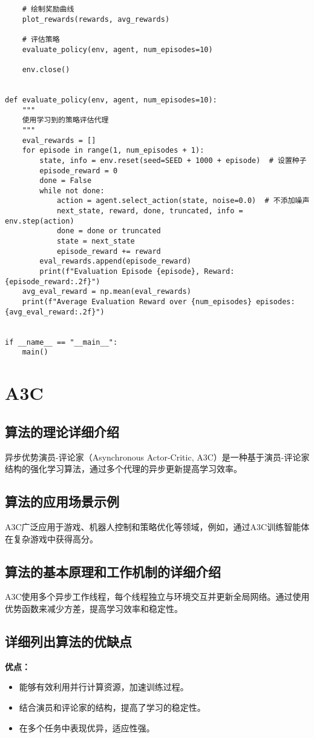 \begin{lstlisting}
    # 绘制奖励曲线
    plot_rewards(rewards, avg_rewards)

    # 评估策略
    evaluate_policy(env, agent, num_episodes=10)

    env.close()


def evaluate_policy(env, agent, num_episodes=10):
    """
    使用学习到的策略评估代理
    """
    eval_rewards = []
    for episode in range(1, num_episodes + 1):
        state, info = env.reset(seed=SEED + 1000 + episode)  # 设置种子
        episode_reward = 0
        done = False
        while not done:
            action = agent.select_action(state, noise=0.0)  # 不添加噪声
            next_state, reward, done, truncated, info = env.step(action)
            done = done or truncated
            state = next_state
            episode_reward += reward
        eval_rewards.append(episode_reward)
        print(f"Evaluation Episode {episode}, Reward: {episode_reward:.2f}")
    avg_eval_reward = np.mean(eval_rewards)
    print(f"Average Evaluation Reward over {num_episodes} episodes: {avg_eval_reward:.2f}")


if __name__ == "__main__":
    main()

\end{lstlisting}


\section{A3C}
\subsection*{算法的理论详细介绍}
异步优势演员-评论家（Asynchronous Actor-Critic, A3C）是一种基于演员-评论家结构的强化学习算法，通过多个代理的异步更新提高学习效率。

\subsection*{算法的应用场景示例}
A3C广泛应用于游戏、机器人控制和策略优化等领域，例如，通过A3C训练智能体在复杂游戏中获得高分。

\subsection*{算法的基本原理和工作机制的详细介绍}
A3C使用多个异步工作线程，每个线程独立与环境交互并更新全局网络。通过使用优势函数来减少方差，提高学习效率和稳定性。

\subsection*{详细列出算法的优缺点}
\textbf{优点：}
\begin{itemize}
    \item 能够有效利用并行计算资源，加速训练过程。
    \item 结合演员和评论家的结构，提高了学习的稳定性。
    \item 在多个任务中表现优异，适应性强。
\end{itemize}

